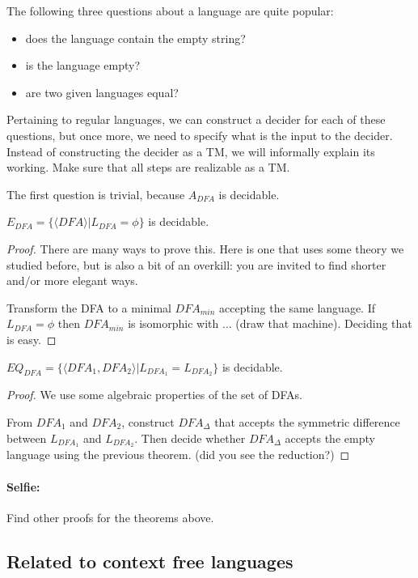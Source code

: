 The following three questions about a language are quite popular:
\begin{itemize}
\item does the language contain the empty string?
\item is the language empty?
\item are two given languages equal?
\end{itemize}

Pertaining to regular languages, we can construct a decider for each
of these questions, but once more, we need to specify what is the
input to the decider. Instead of constructing the decider as a TM, we
will informally explain its working. Make sure that all steps are
realizable as a TM.


The first question is trivial, because $A_{DFA}$ is decidable.

\begin{theorem}
$E_{DFA} = \{\langle DFA \rangle| L_{DFA} = \phi\}$ is decidable.
\end{theorem}
\begin{proof}
There are many ways to prove this. Here is one that uses some theory
we studied before, but is also a bit of an overkill: you are invited
to find shorter and/or more elegant ways.

Transform the DFA to a minimal $DFA_{min}$ accepting the same language.
If $L_{DFA} = \phi$ then $DFA_{min}$ is isomorphic with ... (draw that
machine). Deciding that is easy.
\end{proof}

\begin{theorem}
$EQ_{DFA} = \{\langle DFA_1,DFA_2 \rangle| L_{DFA_1} = L_{DFA_2}\}$ is decidable.
\end{theorem}
\begin{proof}
We use some algebraic properties of the set of DFAs.

From $DFA_1$ and $DFA_2$, construct $DFA_\Delta$ that accepts the
symmetric difference between $L_{DFA_1}$ and $L_{DFA_2}$. Then decide
whether $DFA_\Delta$ accepts the empty language using the previous
theorem. (did you see the reduction?)
\end{proof}


\paragraph{Selfie:} Find other proofs for the theorems above.

\subsection{Related to context free languages}

